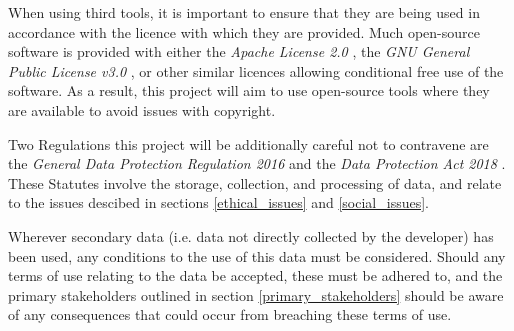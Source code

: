 %
%
%

When using third tools, it is important to ensure that they are being used in accordance with the licence with which they are provided.
Much open-source software is provided with either the \textit{Apache License 2.0} \cite{apache_2_0}, the \textit{GNU General Public License v3.0} \cite{gnu_gpl_3}, or other similar licences allowing conditional free use of the software.
As a result, this project will aim to use open-source tools where they are available to avoid issues with copyright.

Two Regulations this project will be additionally careful not to contravene are the \textit{General Data Protection Regulation 2016} \cite{eu_2016_679} and the \textit{Data Protection Act 2018} \cite{uk_dpa_2018}. These Statutes involve the storage, collection, and processing of data, and relate to the issues descibed in sections \ref{ethical_issues} and \ref{social_issues}.

Wherever secondary data (i.e. data not directly collected by the developer) has been used, any conditions to the use of this data must be considered. Should any terms of use relating to the data be accepted, these must be adhered to, and the primary stakeholders outlined in section \ref{primary_stakeholders} should be aware of any consequences that could occur from breaching these terms of use.
